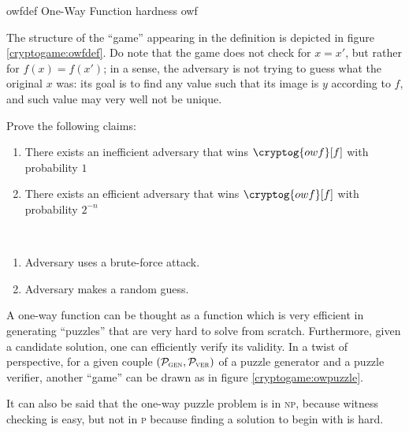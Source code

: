 \begin{cryptogame}
    {owfdef}
    {One-Way Function hardness}
    {owf}


    \cseqdelay


\end{cryptogame}

The structure of the ``game'' appearing in the definition is depicted in figure \ref{cryptogame:owfdef}. Do note that the game does not check for $x = x'$, but rather for $f(x) = f(x')$; in a sense, the adversary is not trying to guess what the original $x$ was: its goal is to find any value such that its image is $y$ according to $f$, and such value may very well not be unique.

\begin{exercise} \label{ex:owf}
    Prove the following claims:
    \begin{enumerate}
        \item There exists an inefficient adversary that wins $\cryptog{owf}[f]$ with probability $1$
        \item There exists an efficient adversary that wins $\cryptog{owf}[f]$ with probability $2^{-n}$
    \end{enumerate}
\end{exercise}

\begin{solution}[\ref{ex:owf}]\
    \begin{enumerate}
        \item Adversary uses a brute-force attack.
        \item Adversary makes a random guess.
    \end{enumerate}
\end{solution}

A one-way function can be thought as a function which is very efficient in generating ``puzzles'' that are very hard to solve from scratch. Furthermore, given a candidate solution, one can efficiently verify its validity. In a twist of perspective, for a given couple $(\mathcal{P}_\textsc{gen},\mathcal{P}_\textsc{ver})$ of a puzzle generator and a puzzle verifier, another ``game'' can be drawn as in figure \ref{cryptogame:owpuzzle}.

It can also be said that the one-way puzzle problem is in \textsc{np}, because witness checking is easy, but not in \textsc{p} because finding a solution to begin with is hard.

